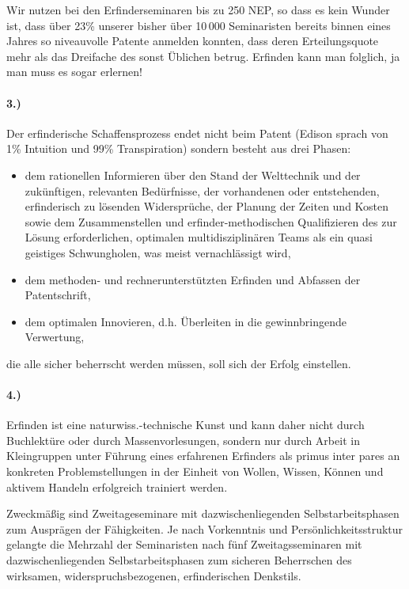 \documentclass[11pt,a4paper]{article}
\begin{document}
Wir nutzen bei den Erfinderseminaren bis zu 250 NEP, so dass es kein Wunder
ist, dass über 23\% unserer bisher über 10\,000 Seminaristen bereits binnen
eines Jahres so niveauvolle Patente anmelden konnten, dass deren
Erteilungsquote mehr als das Dreifache des sonst Üblichen betrug.  Erfinden
kann man folglich, ja man muss es sogar erlernen!

\paragraph{3.)}
Der erfinderische Schaffensprozess endet nicht beim Patent (Edison sprach von
1\% Intuition und 99\% Transpiration) sondern besteht aus drei Phasen:
\begin{itemize}
\item dem rationellen Informieren über den Stand der Welttechnik und der
  zukünftigen, relevanten Bedürfnisse, der vorhandenen oder entstehenden,
  erfinderisch zu lösenden Widersprüche, der Planung der Zeiten und Kosten
  sowie dem Zusammenstellen und erfinder-methodischen Qualifizieren des zur
  Lösung erforderlichen, optimalen multidisziplinären Teams als ein quasi
  geistiges Schwungholen, was meist vernachlässigt wird,
\item dem methoden- und rechnerunterstützten Erfinden und Abfassen der
  Patentschrift,
\item dem optimalen Innovieren, d.h. Überleiten in die gewinnbringende
  Verwertung,
\end{itemize}
die alle sicher beherrscht werden müssen, soll sich der Erfolg einstellen.

\paragraph{4.)}
Erfinden ist eine naturwiss.-technische Kunst und kann daher nicht durch
Buchlektüre oder durch Massenvorlesungen, sondern nur durch Arbeit in
Kleingruppen unter Führung eines erfahrenen Erfinders als primus inter pares
an konkreten Problemstellungen in der Einheit von Wollen, Wissen, Können und
aktivem Handeln erfolgreich trainiert werden.

Zweckmäßig sind Zweitageseminare mit dazwischenliegenden Selbstarbeitsphasen
zum Ausprägen der Fähigkeiten.  Je nach Vorkenntnis und
Persönlichkeitsstruktur gelangte die Mehrzahl der Seminaristen nach fünf
Zweitagsseminaren mit dazwischenliegenden Selbstarbeitsphasen zum sicheren
Beherrschen des wirksamen, widerspruchsbezogenen, erfinderischen Denkstils.
\end{document}
